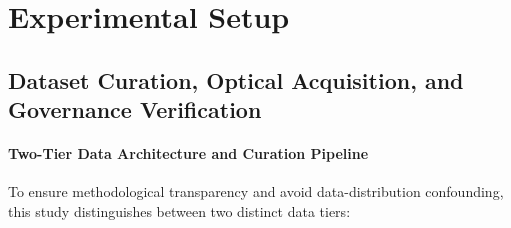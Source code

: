 \documentclass[a4paper,fleqn]{cas-sc}
\begin{document}
\section{Experimental Setup}
\label{sec:setup}

\subsection{Dataset Curation, Optical Acquisition, and Governance Verification}
\paragraph{Two-Tier Data Architecture and Curation Pipeline}
To ensure methodological transparency and avoid data-distribution confounding, this study distinguishes between two distinct data tiers:
\end{document}
